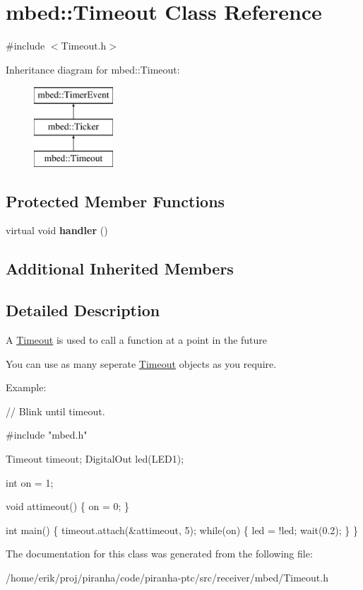\hypertarget{classmbed_1_1Timeout}{}\section{mbed\+:\+:Timeout Class Reference}
\label{classmbed_1_1Timeout}


{\ttfamily \#include $<$Timeout.\+h$>$}

Inheritance diagram for mbed\+:\+:Timeout\+:\begin{figure}[H]
\begin{center}
\leavevmode
\includegraphics[height=3.000000cm]{classmbed_1_1Timeout}
\end{center}
\end{figure}
\subsection*{Protected Member Functions}
\begin{DoxyCompactItemize}
\item 
virtual void {\bfseries handler} ()\hypertarget{classmbed_1_1Timeout_a2324f9b01f39fa36f4b799541a46112b}{}\label{classmbed_1_1Timeout_a2324f9b01f39fa36f4b799541a46112b}

\end{DoxyCompactItemize}
\subsection*{Additional Inherited Members}


\subsection{Detailed Description}
A \hyperlink{classmbed_1_1Timeout}{Timeout} is used to call a function at a point in the future

You can use as many seperate \hyperlink{classmbed_1_1Timeout}{Timeout} objects as you require.

Example\+: 
\begin{DoxyCode}
\textcolor{comment}{// Blink until timeout.}

\textcolor{preprocessor}{#include "mbed.h"}

Timeout timeout;
DigitalOut led(LED1);

\textcolor{keywordtype}{int} on = 1;

\textcolor{keywordtype}{void} attimeout() \{
    on = 0;
\}

\textcolor{keywordtype}{int} main() \{
    timeout.attach(&attimeout, 5);
    \textcolor{keywordflow}{while}(on) \{
        led = !led;
        wait(0.2);
    \}
\}
\end{DoxyCode}
 

The documentation for this class was generated from the following file\+:\begin{DoxyCompactItemize}
\item 
/home/erik/proj/piranha/code/piranha-\/ptc/src/receiver/mbed/Timeout.\+h\end{DoxyCompactItemize}
